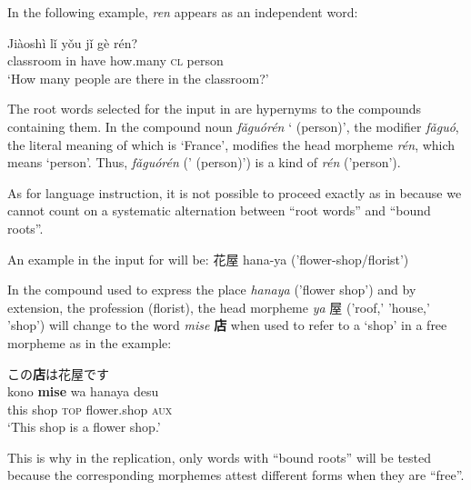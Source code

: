 \documentclass[output=paper,colorlinks,citecolor=brown,modfonts,nonflat]{../langscibook}
\begin{document}
In the following example, \textit{ren} appears as an independent word:

\ea%
    \label{ex:watorek:10}
    \gll    Jiàoshì lǐ  yǒu jǐ gè rén?\\
            classroom in have how.many \textsc{cl} person\\
    \glt    ‘How many people are there in the classroom?’
\z

The root words selected for the input in  are hypernyms to the compounds containing them. In the compound noun \textit{fǎguórén} ‘ (person)’, the modifier \textit{fǎguó}, the literal meaning of which is ‘France’, modifies the head morpheme \textit{rén}, which means ‘person’. Thus, \textit{fǎguórén} (' (person)') is a kind of \textit{rén} ('person').

As for  language instruction, it is not possible to proceed exactly as in  because we cannot count on a systematic alternation between “root words” and “bound roots”.

An example in the input for  will be:  {\cjkfont 花屋} hana-ya ('flower-shop\slash florist') 

In the compound used to express the place \textit{hanaya} ('flower shop') and by extension, the profession (florist), the head morpheme \textit{ya} {\cjkfont 屋} ('roof,' 'house,' 'shop') will change to the word \textit{mise} {\cjkfont\textbf{店}} when used to refer to a ‘shop’ in a free morpheme as in the example:


\ea%
    \label{ex:watorek:11}
                {\cjkfont この\textbf{店}は花屋です}\\
    \gll        kono \textbf{{mise}} wa hanaya desu\\
            this shop \textsc{top} flower.shop \textsc{aux}\\
    \glt    ‘This shop is a flower shop.’
\z

This is why in the  replication, only words with “bound roots” will be tested because the corresponding morphemes attest different forms when they are “free”. 
\end{document}
